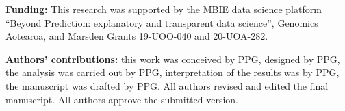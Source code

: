 \documentclass[fleqn,10pt,doc,onecolumn]{SelfArx}%
\begin{document}

\noindent\textbf{Funding:} This research was supported by the MBIE data
science platform ``Beyond Prediction: explanatory and transparent data
science'', Genomics Aotearoa, and Marsden
Grants 19-UOO-040 and 20-UOA-282.

\noindent\textbf{Authors' contributions:} this work was conceived by 
PPG, designed by PPG, the analysis was carried out by PPG, interpretation of the results was by PPG,
the manuscript was drafted by  PPG.
All authors revised and edited the final manuscript. All authors approve the submitted version. 



\end{document}
